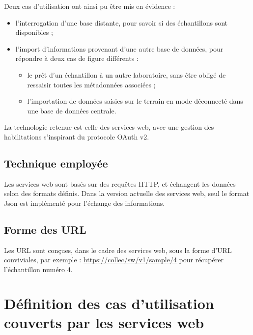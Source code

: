 Deux cas d'utilisation ont ainsi pu être mis en évidence :
\begin{itemize}
\item l'interrogation d'une base distante, pour savoir si des échantillons sont disponibles ;
\item l'import d'informations provenant d'une autre base de données, pour ré\-pondre à deux cas de figure différents :
\begin{itemize}
\item le prêt d'un échantillon à un autre laboratoire, sans être obligé de ressaisir toutes les métadonnées associées ;
\item l'importation de données saisies sur le terrain en mode déconnecté dans une base de données centrale.
\end{itemize}
\end{itemize}

La technologie retenue est celle des services web, avec une gestion des habilitations s'inspirant du protocole OAuth v2.

\subsection{Technique employée}

Les services web sont basés sur des requêtes HTTP, et échangent les données selon des formats définis. Dans la version actuelle des services web, seul le format Json est implémenté pour l'échange des informations.

\subsection{Forme des URL}
Les URL sont conçues, dans le cadre des services web, sous la forme d'URL conviviales, par exemple : \url{https://collec/sw/v1/sample/4} pour récupérer l'échan\-tillon numéro 4.

\section{Définition des cas d'utilisation couverts par les services web}

